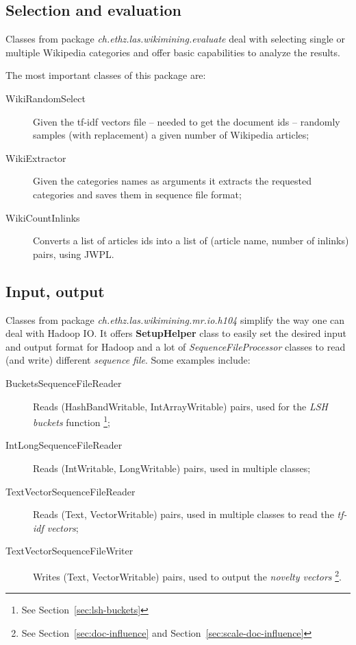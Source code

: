 \subsection{Selection and evaluation}

Classes from  package \emph{ch.ethz.las.wikimining.evaluate} deal with
selecting single or multiple Wikipedia categories and offer basic capabilities
to analyze the results.

The most important classes of this package are:
\begin{description}
  \item[WikiRandomSelect] Given the tf-idf vectors file -- needed to get the
  document ids -- randomly samples (with replacement) a given number of
  Wikipedia articles;
  \item[WikiExtractor] Given the categories names as arguments it extracts the
  requested categories and saves them in sequence file format;
  \item[WikiCountInlinks] Converts a list of articles ids into a list of
  (article name, number of inlinks) pairs, using \ac{JWPL}.
\end{description}

\subsection{Input, output}

Classes from package \emph{ch.ethz.las.wikimining.mr.io.h104} simplify the way
one can deal with Hadoop \ac{IO}.
It offers \textbf{SetupHelper} class to easily set the desired input and output
format for Hadoop and a lot of \emph{SequenceFileProcessor} classes to read
(and write) different \emph{sequence file}.
Some examples include:
\begin{description}
  \item[BucketsSequenceFileReader] Reads (HashBandWritable, IntArrayWritable)
  pairs, used for the \emph{\ac{LSH} buckets} function \footnote{See
  Section~\vref{sec:lsh-buckets}};
  \item[IntLongSequenceFileReader] Reads (IntWritable, LongWritable) pairs,
  used in multiple classes;
  \item[TextVectorSequenceFileReader] Reads (Text, VectorWritable) pairs, used
  in multiple classes to read the \emph{tf-idf vectors};
  \item[TextVectorSequenceFileWriter] Writes (Text, VectorWritable) pairs, used
  to output the \emph{novelty vectors} \footnote{See Section~\vref{sec:doc-influence} and Section~\vref{sec:scale-doc-influence}}.
\end{description}

